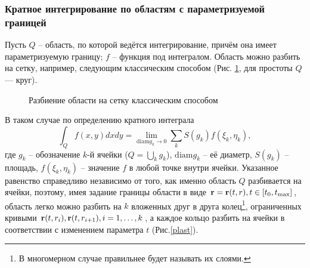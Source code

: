 \documentclass[a4paper, 12pt]{article}
\begin{document}
  
\subsubsection{Кратное интегрирование по областям с параметризуемой границей}
Пусть $Q$ -- область, по которой ведётся интегрирование, причём она имеет параметризуемую границу; $f$ -- функция под интегралом. Область можно разбить на сетку, например, следующим классическим способом (Рис. \ref{classic}, для простоты $Q$ --- круг).

\begin{figure}[h!]
  \noindent{}
  \caption{Разбиение области на сетку классическим способом}
  \label{classic}
  \end{figure} 

В таком случае по определению кратного интеграла $$\int_Q f(x,y)dx dy=\lim_{\text{diam} g_k \rightarrow 0} \sum_k S(g_k) f(\xi_k,\eta_k),$$ где $g_k$ -- обозначение $k$-й ячейки ($Q = \bigcup_k g_k$), $\text{diam} g_k$ -- её диаметр, $S(g_k)$ -- площадь, $f(\xi_k,\eta_k)$ -- значение $f$ в любой точке внутри ячейки.
Указанное равенство справедливо независимо от того, как именно область $Q$ разбивается на ячейки, поэтому, имея задание границы области в виде ${\bf r}={\bf r}(t,r), t \in [t_0, t_{\max}]$, область легко можно разбить на $k$ вложенных друг в друга колец\footnote{В многомерном случае правильнее будет называть их слоями.}, ограниченных кривыми ${\bf r}(t,r_i),{\bf r}(t,r_{i+1}),i =1,\dots,k$, а каждое кольцо разбить на ячейки в соответствии с изменением параметра $t$ (Рис.\ref{plast}).
\end{document}
